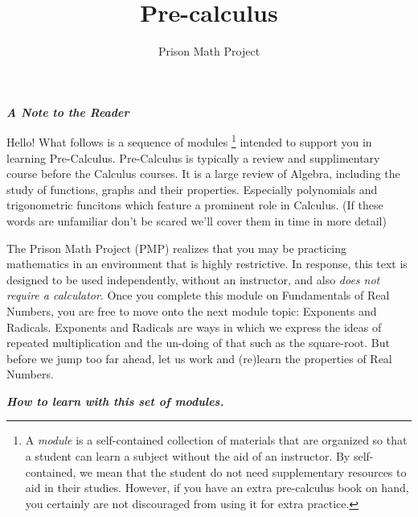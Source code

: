 \documentclass{amsart}
\numberwithin{equation}{section}
\theoremstyle{plain} %
\theoremstyle{definition}
\theoremstyle{remark}
\begin{document}
\title{Pre-calculus}


\author{Prison Math Project}
\date{}


\maketitle

\textbf{\textit{A Note to the Reader}}%

Hello! What follows is a sequence of modules \footnote{A \textit{module} is a self-contained collection of materials that are organized so that a student can learn a subject without the aid of an instructor.
By self-contained, we mean that the student do  not need supplementary resources to aid in their studies. However, if you have an extra pre-calculus book on hand, you certainly are not discouraged from using it 
for extra practice.} intended to support you in learning Pre-Calculus. Pre-Calculus is typically a review and supplimentary course before the Calculus courses. It is a large review of Algebra, including the study
of functions, graphs and their properties. Especially polynomials and trigonometric funcitons which feature a prominent role in Calculus. (If these words are unfamiliar don't be scared we'll cover them in time in more
detail)

The Prison Math Project (PMP) realizes that you may be practicing mathematics in an environment that is highly restrictive. In response, this text is designed to be used independently, without an instructor, 
and also \textit{does not require a calculator}. Once you complete this module on Fundamentals of Real Numbers, you are free to move onto the next module topic: Exponents and Radicals. Exponents and Radicals are
ways in which we express the ideas of repeated multiplication and the un-doing of that such as the square-root. But before we jump too far ahead, let us work and (re)learn the properties of Real Numbers.%


\textbf{\textit{How to learn with this set of modules.}}%
\end{document}
